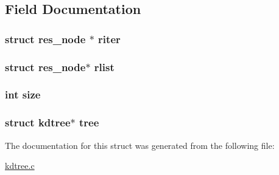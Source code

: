 \subsection{\-Field \-Documentation}
\hypertarget{a00010_a10ec50599e37f9fcb520b8fc6d44728b_a10ec50599e37f9fcb520b8fc6d44728b}{
\subsubsection[{riter}]{\setlength{\rightskip}{0pt plus 5cm}struct {\bf res\-\_\-node} $\ast$ {\bf riter}}}\label{d7/dec/a00010_a10ec50599e37f9fcb520b8fc6d44728b_a10ec50599e37f9fcb520b8fc6d44728b}
\hypertarget{a00010_a1424ef73f7eb289a18a4ce40ac38dedb_a1424ef73f7eb289a18a4ce40ac38dedb}{
\subsubsection[{rlist}]{\setlength{\rightskip}{0pt plus 5cm}struct {\bf res\-\_\-node}$\ast$ {\bf rlist}}}\label{d7/dec/a00010_a1424ef73f7eb289a18a4ce40ac38dedb_a1424ef73f7eb289a18a4ce40ac38dedb}
\hypertarget{a00010_a439227feff9d7f55384e8780cfc2eb82_a439227feff9d7f55384e8780cfc2eb82}{
\subsubsection[{size}]{\setlength{\rightskip}{0pt plus 5cm}int {\bf size}}}\label{d7/dec/a00010_a439227feff9d7f55384e8780cfc2eb82_a439227feff9d7f55384e8780cfc2eb82}
\hypertarget{a00010_ae75a12d07763fe14039f5123e1e3d377_ae75a12d07763fe14039f5123e1e3d377}{
\subsubsection[{tree}]{\setlength{\rightskip}{0pt plus 5cm}struct {\bf kdtree}$\ast$ {\bf tree}}}\label{d7/dec/a00010_ae75a12d07763fe14039f5123e1e3d377_ae75a12d07763fe14039f5123e1e3d377}


\-The documentation for this struct was generated from the following file\-:\begin{DoxyCompactItemize}
\item 
\hyperlink{a00013}{kdtree.\-c}\end{DoxyCompactItemize}
